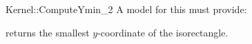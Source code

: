\begin{ccRefFunctionObjectConcept}{Kernel::ComputeYmin_2}
A model for this must provide:


       {returns the smallest $y$-coordinate of the isorectangle.}


\ccRefines
{}



\end{ccRefFunctionObjectConcept}
